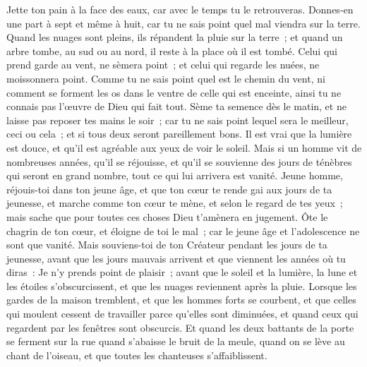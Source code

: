\begin{multicols}{2}
\VerseOne{}Jette ton pain à la face des eaux, car avec le temps tu le retrouveras.
Donnes-en une part à sept et même à huit, car tu ne sais point quel mal viendra sur la terre.
Quand les nuages sont pleins, ils répandent la pluie sur la terre~; et quand un arbre tombe, au sud ou au nord, il reste à la place où il est tombé.
Celui qui prend garde au vent, ne sèmera point~; et celui qui regarde les nuées, ne moissonnera point. 
Comme tu ne sais point quel est le chemin du vent, ni comment se forment les os dans le ventre de celle qui est enceinte, ainsi tu ne connais pas l'œuvre de Dieu qui fait tout.
 Sème ta semence dès le matin, et ne laisse pas reposer tes mains le soir~; car tu ne sais point lequel sera le meilleur, ceci ou cela~; et si tous deux seront pareillement bons.
Il est vrai que la lumière est douce, et qu'il est agréable aux yeux de voir le soleil.
Mais si un homme vit de nombreuses années, qu'il se réjouisse, et qu'il se souvienne des jours de ténèbres qui seront en grand nombre, tout ce qui lui arrivera est vanité.
\VerseOne{}Jeune homme, réjouis-toi dans ton jeune âge, et que ton cœur te rende gai aux jours de ta jeunesse, et marche comme ton cœur te mène, et selon le regard de tes yeux~; mais sache que pour toutes ces choses Dieu t'amènera en jugement. 
Ôte le chagrin de ton cœur, et éloigne de toi le mal~; car le jeune âge et l'adolescence ne sont que vanité. 
Mais souviens-toi de ton Créateur pendant les jours de ta jeunesse, avant que les jours mauvais arrivent et que viennent les années où tu diras~: Je n'y prends point de plaisir~;
avant que le soleil et la lumière, la lune et les étoiles s'obscurcissent, et que les nuages reviennent après la pluie.
Lorsque les gardes de la maison tremblent, et que les hommes forts se courbent, et que celles qui moulent cessent de travailler parce qu'elles sont diminuées, et quand ceux qui regardent par les fenêtres sont obscurcis.
Et quand les deux battants de la porte se ferment sur la rue quand s'abaisse le bruit de la meule, quand on se lève au chant de l'oiseau, et que toutes les chanteuses s'affaiblissent.

\end{multicols}
